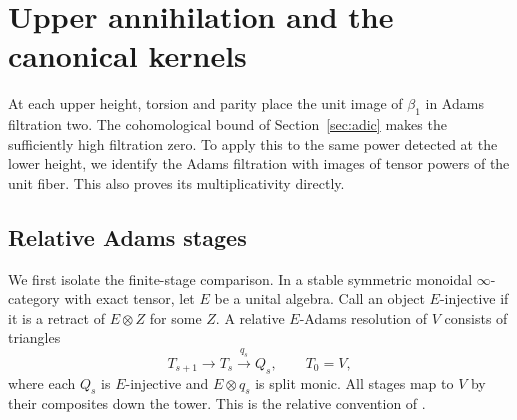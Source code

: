 \section{Upper annihilation and the canonical kernels}\label{sec:kernels}

At each upper height, torsion and parity place the unit image of
$\beta_1$ in Adams filtration two. The cohomological bound of
Section~\ref{sec:adic} makes the sufficiently high filtration zero.
To apply this to the same power detected at the lower height, we identify the Adams
filtration with images of tensor powers of the unit fiber. This also
proves its multiplicativity directly.

\subsection{Relative Adams stages}
\label{wimg:local-tower}

We first isolate the finite-stage comparison. In a stable symmetric
monoidal $\infty$-category with exact tensor, let $E$ be a unital algebra.
Call an object $E$-injective if it is a retract of $E\otimes Z$ for
some $Z$. A relative $E$-Adams resolution of $V$ consists of triangles
\[
 T_{s+1}\longrightarrow T_s\xrightarrow{q_s}Q_s,
 \qquad T_0=V,
\]
where each $Q_s$ is $E$-injective and $E\otimes q_s$ is split monic.
All stages map to $V$ by their composites down the tower. This is the
relative convention of \cite[Appendix~A]{dh2004}.

